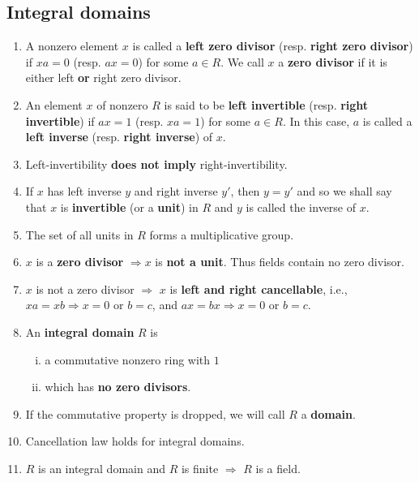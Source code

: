 \subsection*{Integral domains}
\begin{enumerate}[(1)]
	\item A nonzero element $x$ is called a \textbf{left zero divisor} (resp. \textbf{right zero divisor}) if $xa = 0$ (resp. $ax = 0$) for some $a\in R$. We call $x$ a \textbf{zero divisor} if it is either left \textbf{or} right zero divisor.
	\item An element $x$ of nonzero $R$ is said to be \textbf{left invertible} (resp. \textbf{right invertible}) if $ax =1$ (resp. $xa = 1$) for some $a\in R$. In this case, $a$ is called a \textbf{left inverse} (resp. \textbf{right inverse}) of $x$.
	\item Left-invertibility \textbf{does not imply} right-invertibility.
	\item If $x$ has left inverse $y$ and right inverse $y'$, then $y=y'$ and so we shall say that $x$ is \textbf{invertible} (or a \textbf{unit}) in $R$ and $y$ is called the inverse of $x$.
	\item The set of all units in $R$ forms a multiplicative group.
	\item $x$ is a \textbf{zero divisor} $\Rightarrow x$ is \textbf{not a unit}. Thus fields contain no zero divisor.
	\item $x$ is not a zero divisor $\Rightarrow$ $x$ is \textbf{left and right cancellable}, i.e., $xa=xb\Rightarrow x = 0$ or $b=c$, and $ax=bx\Rightarrow x = 0$ or $b=c$.
	\item An \textbf{integral domain} $R$ is 
	\begin{enumerate}[(i)]
		\item a commutative nonzero ring with $1$ 
		\item which has \textbf{no zero divisors}.
	\end{enumerate}
	\item If the commutative property is dropped, we will call $R$ a \textbf{domain}.
	\item Cancellation law holds for integral domains.
	\item $R$ is an integral domain and $R$ is finite $\Rightarrow$ $R$ is a field.
\end{enumerate}